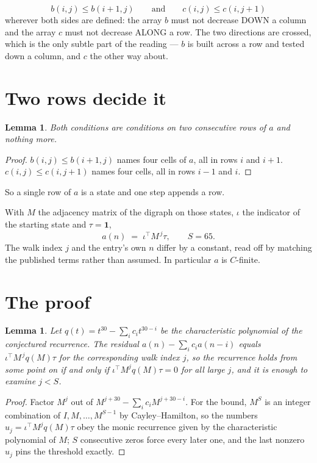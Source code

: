 \documentclass[11pt,a4paper]{article}
\theoremstyle{plain}
\newtheorem{lemma}[theorem]{Lemma}
\theoremstyle{definition}
\begin{document}
\[
b(i,j)\le b(i{+}1,j)\qquad\text{and}\qquad c(i,j)\le c(i,j{+}1)
\]
wherever both sides are defined: the array $b$ must not decrease DOWN a column and the array
$c$ must not decrease ALONG a row. The two directions are crossed, which is the only subtle
part of the reading --- $b$ is built across a row and tested down a column, and $c$ the other
way about.


\section{Two rows decide it}

\begin{lemma}\label{lem:win}
Both conditions are conditions on two consecutive rows of $a$ and nothing more.
\end{lemma}

\begin{proof}
$b(i,j)\le b(i{+}1,j)$ names four cells of $a$, all in rows $i$ and $i+1$. $c(i,j)\le
c(i,j{+}1)$ names four cells, all in rows $i-1$ and $i$.
\end{proof}

So a single row of $a$ is a state and one step appends a row.

With $M$ the adjacency matrix of the digraph on those states, $\iota$ the indicator of the
starting state and $\tau=\mathbf{1}$,
\[
a(n)\;=\;\iota^{\!\top}M^{\,j}\tau ,\qquad S=65.
\]
The walk index $j$ and the entry's own $n$ differ by a constant, read off by matching the
published terms rather than assumed. In particular $a$ is $C$-finite.

\section{The proof}

\begin{lemma}\label{lem:crit}
Let $q(t)=t^{30}-\sum_i c_it^{30-i}$ be the characteristic polynomial of the
conjectured recurrence. The residual $a(n)-\sum_ic_ia(n-i)$ equals
$\iota^{\!\top}M^{\,j}q(M)\tau$ for the corresponding walk index $j$, so the recurrence
holds from some point on if and only if $\iota^{\!\top}M^{j}q(M)\tau=0$ for all large $j$,
and it is enough to examine $j<S$.
\end{lemma}

\begin{proof}
Factor $M^{j}$ out of $M^{j+30}-\sum_ic_iM^{j+30-i}$. For the bound, $M^{S}$
is an integer combination of $I,M,\dots,M^{S-1}$ by Cayley--Hamilton, so the numbers
$u_j=\iota^{\!\top}M^{j}q(M)\tau$ obey the monic recurrence given by the characteristic
polynomial of $M$; $S$ consecutive zeros force every later one, and the last nonzero $u_j$
pins the threshold exactly.
\end{proof}
\end{document}
